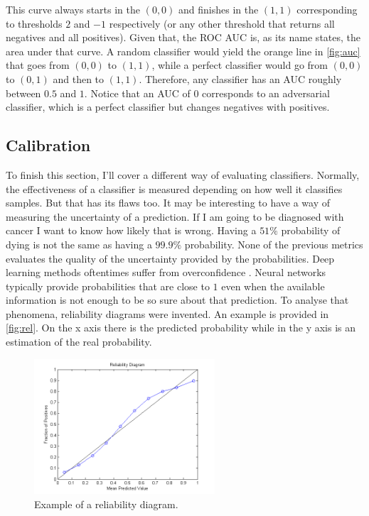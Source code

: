 This curve always starts in the $(0,0)$ and finishes in the $(1,1)$ corresponding to thresholds $2$ and $-1$ respectively (or any other threshold that returns all negatives and all positives). Given that, the ROC AUC is, as its name states, the area under that curve. A random classifier would yield the orange line in \autoref{fig:auc} that goes from $(0,0)$ to $(1,1)$, while a perfect classifier would go from $(0,0)$ to $(0,1)$ and then to $(1,1)$. Therefore, any classifier has an AUC roughly between $0.5$ and $1$. Notice that an AUC of $0$ corresponds to an adversarial classifier, which is a perfect classifier but changes negatives with positives.

\subsection{Calibration}

To finish this section, I'll cover a different way of evaluating classifiers. Normally, the effectiveness of a classifier is measured depending on how well it classifies samples. But that has its flaws too. It may be interesting to have a way of measuring the uncertainty of a prediction. If I am going to be diagnosed with cancer I want to know how likely that is wrong. Having a $51\%$ probability of dying is not the same as having a $99.9\%$ probability. None of the previous metrics evaluates the quality of the uncertainty provided by the probabilities. Deep learning methods oftentimes suffer from overconfidence \cite{wei2022mitigating, meronen2023fixing, melotti2022reducing}. Neural networks typically provide probabilities that are close to $1$ even when the available information is not enough to be so sure about that prediction. To analyse that phenomena, reliability diagrams were invented. An example is provided in \autoref{fig:rel}. On the x axis there is the predicted probability while in the y axis is an estimation of the real probability.

\begin{figure}[ht]
    \centering
    \includegraphics[width=0.6\textwidth]{imgs/rel.png}
    \caption{Example of a reliability diagram.}
    \label{fig:rel}
\end{figure}

